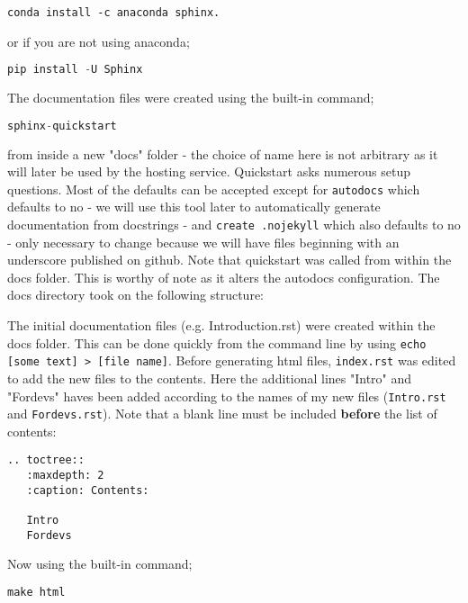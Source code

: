 \documentclass{article}
\begin{document}
\begin{lstlisting}
conda install -c anaconda sphinx.
\end{lstlisting}

or if you are not using anaconda;

\begin{lstlisting}[language=Python]
pip install -U Sphinx
\end{lstlisting}

The documentation files were created using the built-in command;
\begin{lstlisting}[language=Python]
sphinx-quickstart
\end{lstlisting}
from inside a new "docs" folder - the choice of name here is not arbitrary as it will later be used by the hosting service. Quickstart asks numerous setup questions. Most of the defaults can be accepted except for \lstinline{autodocs} which defaults to no - we will use this tool later to automatically generate documentation from docstrings - and \lstinline{create .nojekyll} which also defaults to no - only necessary to change because we will have files beginning with an underscore published on github. Note that quickstart was called from within the docs folder. This is worthy of note as it alters the autodocs configuration. The docs directory took on the following structure:


The initial documentation files (e.g. Introduction.rst) were created within the docs folder. This can be done quickly from the command line by using \lstinline{echo [some text] > [file name]}. Before generating html files, \lstinline{index.rst} was edited to add the new files to the contents. Here the additional lines "Intro" and "Fordevs" haves been added according to the names of my new files (\lstinline{Intro.rst} and \lstinline{Fordevs.rst}). Note that a blank line must be included \textbf{before} the list of contents:

\begin{verbatim}
.. toctree::
   :maxdepth: 2
   :caption: Contents:

   Intro
   Fordevs
\end{verbatim}

Now using the built-in command;

\begin{lstlisting}[language=Python]
make html
\end{lstlisting}
\end{document}

